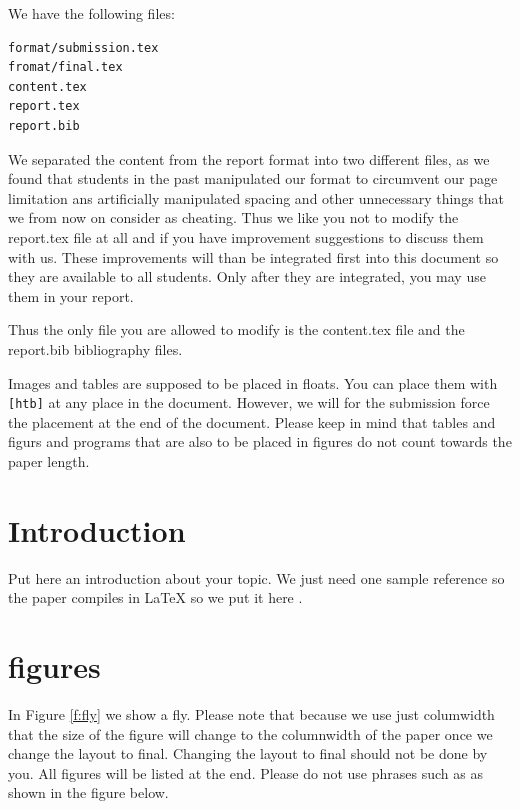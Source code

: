 We have the following files:

\begin{verbatim}
format/submission.tex
fromat/final.tex
content.tex
report.tex
report.bib
\end{verbatim}

We separated the content from the report format into two different
files, as we found that students in the past manipulated our format to
circumvent our page limitation ans artificially manipulated spacing and
other unnecessary things that we from now on consider as cheating.
Thus we like you not to modify the report.tex file at all and if you
have improvement suggestions to discuss them with us. These
improvements will than be integrated first into this document so they
are available to all students. Only after they are integrated, you may
use them in your report. 

Thus the only file you are allowed to modify is the content.tex file
and the report.bib bibliography files.

Images and tables are supposed to be placed in floats. You can place
them with \verb|[htb]| at any place in the document. However, we will
for the submission force the placement at the end of the
document. Please keep in mind that tables and figurs and programs
that are also to be placed in figures do not count towards the paper length.

\section{Introduction}

Put here an introduction about your topic. 
We just need one sample reference so the paper compiles in LaTeX so we
put it here \cite{editor00}.

\section{figures}

In Figure \ref{f:fly} we show a fly. Please note that because we use
just columwidth that the size of the figure will change to the
columnwidth of the paper once we change the layout to final. Changing
the layout to final should not be done by you. All figures will be
listed at the end. Please do not use phrases such as as shown in the
figure below.

